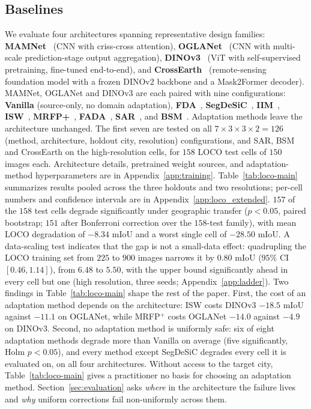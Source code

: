 \subsection{Baselines}
\label{sec:baselines}

We evaluate four architectures spanning representative design families: \textbf{MAMNet}~\cite{mamnet} (CNN with criss-cross attention), \textbf{OGLANet}~\cite{oglanet} (CNN with multi-scale prediction-stage output aggregation), \textbf{DINOv3}~\cite{dinov3} (ViT with self-supervised pretraining, fine-tuned end-to-end), and \textbf{CrossEarth}~\cite{gong2025crossearth} (remote-sensing foundation model with a frozen DINOv2 backbone and a Mask2Former decoder). MAMNet, OGLANet and DINOv3 are each paired with nine configurations: \textbf{Vanilla} (source-only, no domain adaptation), \textbf{FDA}~\cite{fda}, \textbf{SegDeSiC}~\cite{segdesicnet}, \textbf{IIM}~\cite{yola}, \textbf{ISW}~\cite{isw}, \textbf{MRFP+}~\cite{mrfp}, \textbf{FADA}~\cite{fada}, \textbf{SAR}~\cite{niu2023sar}, and \textbf{BSM}~\cite{luo2023bsm}. Adaptation methods leave the architecture unchanged. The first seven are tested on all $7 \times 3 \times 3 \times 2 = 126$ (method, architecture, holdout city, resolution) configurations, and SAR, BSM and CrossEarth on the high-resolution cells, for $158$ LOCO test cells of $150$ images each. Architecture details, pretrained weight sources, and adaptation-method hyperparameters are in Appendix~\ref{app:training}. Table~\ref{tab:loco-main} summarizes results pooled across the three holdouts and two resolutions; per-cell numbers and confidence intervals are in Appendix~\ref{app:loco_extended}. $157$ of the $158$ test cells degrade significantly under geographic transfer ($p < 0.05$, paired bootstrap; $151$ after Bonferroni correction over the $158$-test family), with mean LOCO degradation of $-8.34$ mIoU and a worst single cell of $-28.50$ mIoU. A data-scaling test indicates that the gap is not a small-data effect: quadrupling the LOCO training set from $225$ to $900$ images narrows it by $0.80$ mIoU ($95\%$ CI $[0.46, 1.14]$), from $6.48$ to $5.50$, with the upper bound significantly ahead in every cell but one (high resolution, three seeds; Appendix~\ref{app:ladder}). Two findings in Table~\ref{tab:loco-main} shape the rest of the paper. First, the cost of an adaptation method depends on the architecture: ISW costs DINOv3 $-18.5$ mIoU against $-11.1$ on OGLANet, while MRFP$^+$ costs OGLANet $-14.0$ against $-4.9$ on DINOv3. Second, no adaptation method is uniformly safe: six of eight adaptation methods degrade more than Vanilla on average (five significantly, Holm $p < 0.05$), and every method except SegDeSiC degrades every cell it is evaluated on, on all four architectures. Without access to the target city, Table~\ref{tab:loco-main} gives a practitioner no basis for choosing an adaptation method. Section~\ref{sec:evaluation} asks \textit{where} in the architecture the failure lives and \textit{why} uniform corrections fail non-uniformly across them.

